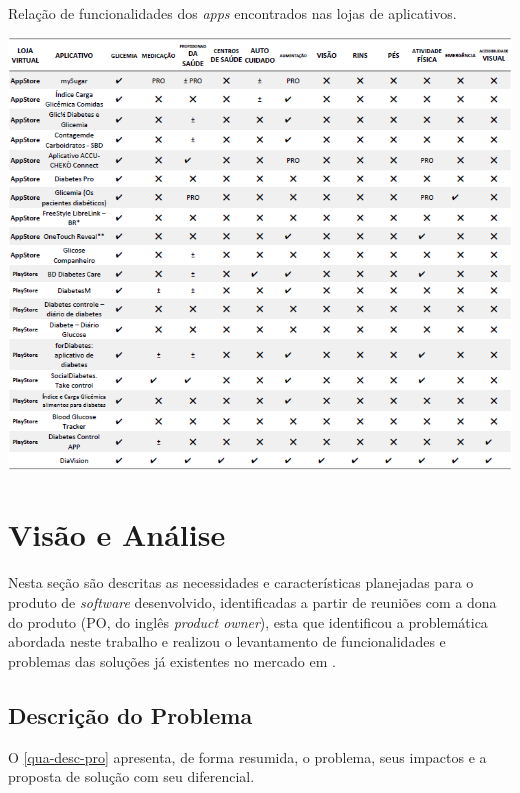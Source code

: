 \begin{table}[htb]
    \caption{\label{tab_cor_func}Relação de funcionalidades dos \emph{apps} encontrados nas lojas de aplicativos.}
    \begin{center}
        \includegraphics[scale=0.75]{Imagens/proposta/busca_anterioridade.png}
    \end{center}
\end{table}

\newpage

\section{Visão e Análise}

Nesta seção são descritas as necessidades e características planejadas para o produto de \emph{software} desenvolvido,
identificadas a partir de reuniões com a dona do produto (PO, do inglês \emph{product owner}), esta que identificou a
problemática abordada neste trabalho e
realizou o levantamento de funcionalidades e problemas das soluções já existentes no mercado em .

\subsection{Descrição do Problema}

O \autoref{qua-desc-pro} apresenta, de forma resumida, o problema, seus impactos e a proposta de solução com seu diferencial.

